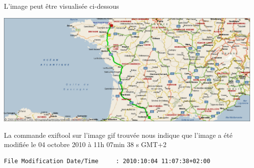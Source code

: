 \documentclass[a4paper,11pt]{article}
\begin{document}
L'image peut être visualisée ci-dessous 

\includegraphics[width=\textwidth]{image_map.png}

La commande exiftool sur l'image gif trouvée nous indique que l'image a été modifiée le 04
octobre 2010 à 11h 07min 38 s GMT+2
\begin{verbatim}
File Modification Date/Time     : 2010:10:04 11:07:38+02:00
\end{verbatim}
\end{document}
